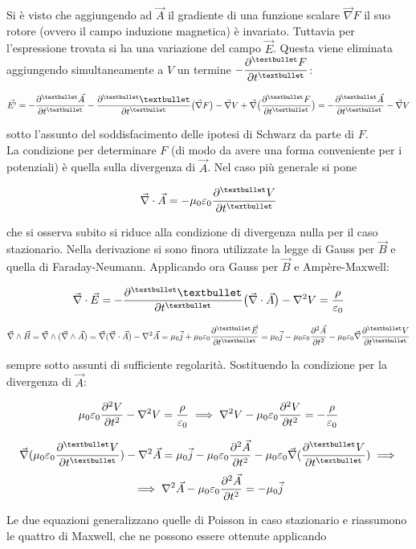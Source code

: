 Si è visto che aggiungendo ad $\vec{A}$ il gradiente di una funzione scalare $\vec{\nabla} F$ il suo rotore (ovvero il campo induzione magnetica) è invariato. Tuttavia per l'espressione trovata si ha una variazione del campo $\vec{E}$. Questa viene eliminata aggiungendo simultaneamente a $V$ un termine $\ds - \pdv[•]{F}{t}$:

\[\vec{E'} = - \pdv[•]{\vec{A}}{t} - \pdv[•]{•}{t}\big(\vec{\nabla}F \big) - \vec{\nabla}V + \vec{\nabla} \big(\pdv[•]{F}{t}\big) = - \pdv[•]{\vec{A}}{t} - \vec{\nabla}V \]

sotto l'assunto del soddisfacimento delle ipotesi di Schwarz da parte di $F$.
\\La condizione per determinare $F$ (di modo da avere una forma conveniente per i potenziali) è quella sulla divergenza di $\vec{A}$. Nel caso più generale si pone

\[\vec{\nabla} \cdot \vec{A} = - \mu_0 \varepsilon_0 \pdv[•]{V}{t}\]

che si osserva subito si riduce alla condizione di divergenza nulla per il caso stazionario. Nella derivazione si sono finora utilizzate la legge di Gauss per $\vec{B}$ e quella di Faraday-Neumann. Applicando ora Gauss per $\vec{B}$ e Ampère-Maxwell:

\[\vec{\nabla} \cdot \vec{E} = - \pdv[•]{•}{t} \big(\vec{\nabla} \cdot \vec{A}\big) - \nabla^2 V = \frac{\rho}{\varepsilon_0}\]

\[\vec{\nabla} \wedge \vec{B} = \vec{\nabla} \wedge (\vec{\nabla} \wedge \vec{A}) = \vec{\nabla} (\vec{\nabla} \cdot \vec{A}) - \nabla^2 \vec{A} = \mu_0 \vec{j} + \mu_0 \varepsilon_0 \pdv[•]{\vec{E}}{t} = \mu_0 \vec{j} - \mu_0 \varepsilon_0 \pdv[2]{\vec{A}}{t} - \mu_0 \varepsilon_0 \vec{\nabla} \pdv[•]{V}{t}\]

sempre sotto assunti di sufficiente regolarità. Sostituendo la condizione per la divergenza di $\vec{A}$:

\[\mu_0 \varepsilon_0 \pdv[2]{V}{t} - \nabla^2 V = \frac{\rho}{\varepsilon_0} \implies \nabla^2 V - \mu_0 \varepsilon_0 \pdv[2]{V}{t} = - \frac{\rho}{\varepsilon_0}\]

\[\vec{\nabla} (\mu_0 \varepsilon_0 \pdv[•]{V}{t}) - \nabla^2 \vec{A} = \mu_0 \vec{j} - \mu_0 \varepsilon_0 \pdv[2]{\vec{A}}{t} - \mu_0 \varepsilon_0 \vec{\nabla} (\pdv[•]{V}{t}) \implies\]
\[\implies \nabla^2 \vec{A} - \mu_0 \varepsilon_0 \pdv[2]{\vec{A}}{t} = - \mu_0 \vec{j}\]

Le due equazioni generalizzano quelle di Poisson in caso stazionario e riassumono le quattro di Maxwell, che ne possono essere ottenute applicando

